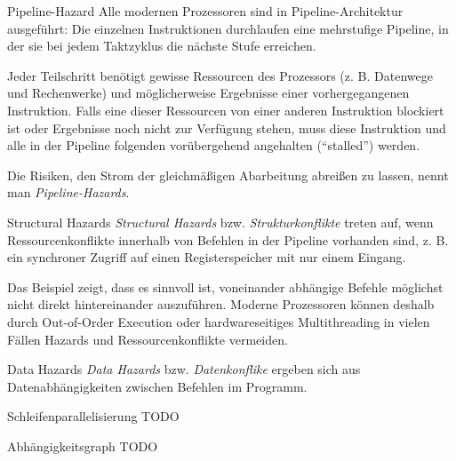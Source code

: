 \begin{defi}{Pipeline-Hazard}
    Alle modernen Prozessoren sind in Pipeline-Architektur ausgeführt:
    Die einzelnen Instruktionen durchlaufen eine mehrstufige Pipeline, in der sie bei jedem Taktzyklus die nächste Stufe erreichen.
    
    Jeder Teilschritt benötigt gewisse Ressourcen des Prozessors (z. B. Datenwege und Rechenwerke) und möglicherweise Ergebnisse einer vorhergegangenen Instruktion.
    Falls eine dieser Ressourcen von einer anderen Instruktion blockiert ist oder Ergebnisse noch nicht zur Verfügung stehen, muss diese Instruktion und alle in der Pipeline folgenden vorübergehend angehalten (\enquote{stalled}) werden.
    
    Die Risiken, den Strom der gleichmäßigen Abarbeitung abreißen zu lassen, nennt man \emph{Pipeline-Hazards}.
\end{defi}

\begin{defi}{Structural Hazards}
    \emph{Structural Hazards} bzw. \emph{Strukturkonflikte} treten auf, wenn Ressourcenkonflikte innerhalb von Befehlen in der Pipeline vorhanden sind, z. B. ein synchroner Zugriff auf einen Registerspeicher mit nur einem Eingang.
    
    Das Beispiel zeigt, dass es sinnvoll ist, voneinander abhängige Befehle möglichst nicht direkt hintereinander auszuführen.
    Moderne Prozessoren können deshalb durch Out-of-Order Execution oder hardwareseitiges Multithreading in vielen Fällen Hazards und Ressourcenkonflikte vermeiden.
\end{defi}

\begin{defi}{Data Hazards}
    \emph{Data Hazards} bzw. \emph{Datenkonflike} ergeben sich aus Datenabhängigkeiten zwischen Befehlen im Programm.
\end{defi}

\begin{defi}{Schleifenparallelisierung}
    TODO
\end{defi}

\begin{defi}{Abhängigkeitsgraph}
    TODO
\end{defi}

